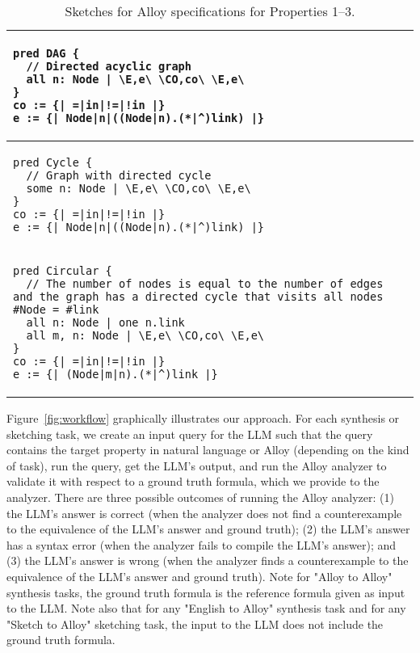 \begin{table}[!h]
\centering
\begin{tabular}{p{12cm}}
\hline
\begin{lstlisting}[style=AlloyTable]
pred DAG {
  // Directed acyclic graph
  all n: Node | \E,e\ \CO,co\ \E,e\
}
co := {| =|in|!=|!in |}
e := {| Node|n|((Node|n).(*|^)link) |}
\end{lstlisting} \\ \hline

\begin{lstlisting}[style=AlloyTable]
pred Cycle {
  // Graph with directed cycle
  some n: Node | \E,e\ \CO,co\ \E,e\
}
co := {| =|in|!=|!in |}
e := {| Node|n|((Node|n).(*|^)link) |}
\end{lstlisting} \\ \hline

\begin{lstlisting}[style=AlloyTable]
pred Circular {
  // The number of nodes is equal to the number of edges and the graph has a directed cycle that visits all nodes
#Node = #link
  all n: Node | one n.link
  all m, n: Node | \E,e\ \CO,co\ \E,e\
}
co := {| =|in|!=|!in |}
e := {| (Node|m|n).(*|^)link |}
\end{lstlisting} \\ \hline

\end{tabular}
\vspace*{2ex}
\caption{Sketches for Alloy specifications for Properties 1--3.}
\vspace*{-8ex}
\label{tab:sketches-1-3}
\end{table}

Figure~\ref{fig:workflow} graphically illustrates our approach.
For each synthesis or sketching task, we create an input query for the LLM such that the query contains the target property in natural language or Alloy (depending on the kind of task), run the query, get the LLM's output, and run the Alloy analyzer to validate it with respect to a ground truth formula, which we provide to the analyzer. There are three possible outcomes of running the Alloy analyzer: (1) the LLM's answer is correct (when the analyzer does not find a counterexample to the equivalence of the LLM's answer and ground truth); (2) the LLM's answer has a syntax error (when the analyzer fails to compile the LLM's answer); and (3) the LLM's answer is wrong (when the analyzer finds a counterexample to the equivalence of the LLM's answer and ground truth). Note for "Alloy to Alloy" synthesis tasks, the ground truth formula is the reference formula given as input to the LLM. Note also that for any "English to Alloy" synthesis task and for any "Sketch to Alloy" sketching task, the input to the LLM does not include the ground truth formula.

